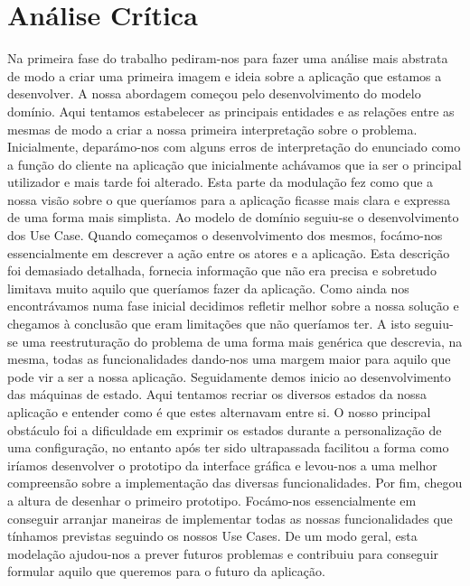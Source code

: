\section{Análise Crítica}
Na primeira fase do trabalho pediram-nos para fazer uma análise mais abstrata de modo a criar uma primeira imagem e ideia sobre a aplicação que estamos a desenvolver. A nossa abordagem começou pelo desenvolvimento do modelo domínio. Aqui tentamos estabelecer as principais entidades e as relações entre as mesmas de modo a criar a nossa primeira interpretação sobre o problema. Inicialmente, deparámo-nos com alguns erros de interpretação do enunciado como a função do cliente na aplicação que inicialmente achávamos que ia ser o principal utilizador e mais tarde foi alterado. Esta parte da modulação fez como que a nossa visão sobre o que queríamos para a aplicação ficasse mais clara e expressa de uma forma mais simplista. Ao modelo de domínio seguiu-se o desenvolvimento dos Use Case. Quando começamos o desenvolvimento dos mesmos, focámo-nos essencialmente em descrever a ação entre os atores e a aplicação. Esta descrição foi demasiado detalhada, fornecia informação que não era precisa e sobretudo limitava muito aquilo que queríamos fazer da aplicação. Como ainda nos encontrávamos numa fase inicial decidimos refletir melhor sobre a nossa solução e chegamos à conclusão que eram limitações que não queríamos ter. A isto seguiu-se uma reestruturação do problema de uma forma mais genérica que descrevia, na mesma, todas as funcionalidades dando-nos uma margem maior para aquilo que pode vir a ser a nossa aplicação.
Seguidamente demos inicio ao desenvolvimento das máquinas de estado. Aqui tentamos recriar os diversos estados da nossa aplicação e entender como é que estes alternavam entre si. O nosso principal obstáculo foi a dificuldade em exprimir os estados durante a personalização de uma configuração, no entanto após ter sido ultrapassada facilitou a forma como iríamos desenvolver o prototipo da interface gráfica e levou-nos a uma melhor compreensão sobre a implementação das diversas funcionalidades. Por fim, chegou a altura de desenhar o primeiro prototipo. Focámo-nos essencialmente em conseguir arranjar maneiras de implementar todas as nossas funcionalidades que tínhamos previstas seguindo os nossos Use Cases. De um modo geral, esta modelação ajudou-nos a prever futuros problemas e contribuiu para conseguir formular aquilo que queremos para o futuro da aplicação.

